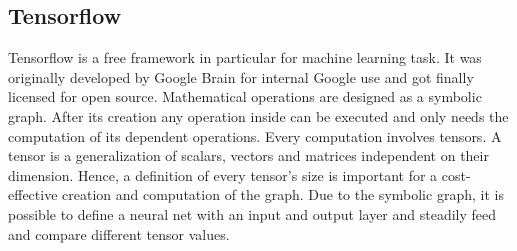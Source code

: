 \subsection{Tensorflow}
\label{sec:software-tensorflow}
Tensorflow is a free framework in particular for machine learning task.
It was originally developed by Google Brain for internal Google use and got finally licensed for open source. 
Mathematical operations are designed as a symbolic graph.
After its creation any operation inside can be executed and only needs the computation of its dependent operations.
Every computation involves tensors.
A tensor is a generalization of scalars, vectors and matrices independent on their dimension.
Hence, a definition of every tensor's size is important for a cost-effective creation and computation of the graph.
Due to the symbolic graph, it is possible to define a neural net with an input and output layer and steadily feed and compare different tensor values.
